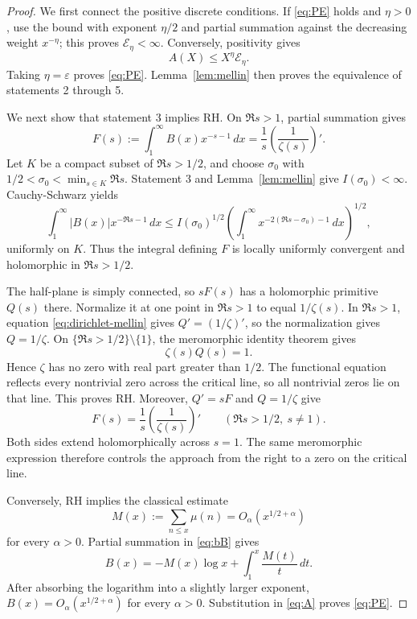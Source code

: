 \documentclass[11pt,a4paper]{amsart}
\theoremstyle{definition}
\theoremstyle{remark}
\begin{document}
\begin{proof}
We first connect the positive discrete conditions.  If
\eqref{eq:PE} holds and $\eta>0$, use the bound with exponent $\eta/2$
and partial summation against the decreasing weight $x^{-\eta}$; this
proves $\mathcal E_\eta<\infty$.  Conversely, positivity gives
\[
 A(X)\leq X^\eta\mathcal E_\eta.
\]
Taking $\eta=\varepsilon$ proves \eqref{eq:PE}.  Lemma~\ref{lem:mellin}
then proves the equivalence of statements 2 through 5.

We next show that statement 3 implies RH.  On $\Re s>1$, partial
summation gives
\begin{equation}\label{eq:dirichlet-mellin}
 F(s):=\int_1^\infty B(x)x^{-s-1}\,dx
 =\frac{1}{s}\left(\frac{1}{\zeta(s)}\right)'.
\end{equation}
Let $K$ be a compact subset of $\Re s>1/2$, and choose
$\sigma_0$ with $1/2<\sigma_0<\min_{s\in K}\Re s$.  Statement 3 and
Lemma~\ref{lem:mellin} give $I(\sigma_0)<\infty$.  Cauchy-Schwarz yields
\[
 \int_1^\infty |B(x)|x^{-\Re s-1}\,dx
 \leq I(\sigma_0)^{1/2}
 \left(\int_1^\infty
 x^{-2(\Re s-\sigma_0)-1}\,dx\right)^{1/2},
\]
uniformly on $K$.  Thus the integral defining $F$ is locally uniformly
convergent and holomorphic in $\Re s>1/2$.

The half-plane is simply connected, so $sF(s)$ has a holomorphic primitive
$Q(s)$ there.  Normalize it at one point in $\Re s>1$ to equal
$1/\zeta(s)$.  In $\Re s>1$, equation \eqref{eq:dirichlet-mellin} gives
$Q'=(1/\zeta)'$, so the normalization gives $Q=1/\zeta$.  On
$\{\Re s>1/2\}\setminus\{1\}$, the meromorphic identity theorem gives
\[
 \zeta(s)Q(s)=1.
\]
Hence $\zeta$ has no zero with real part greater than $1/2$.  The
functional equation reflects every nontrivial zero across the critical
line, so all nontrivial zeros lie on that line.  This proves RH.
Moreover, $Q'=sF$ and $Q=1/\zeta$ give
\[
 F(s)=\frac{1}{s}\left(\frac{1}{\zeta(s)}\right)'
 \qquad(\Re s>1/2,\ s\neq1).
\]
Both sides extend holomorphically across $s=1$.
The same meromorphic expression therefore controls the approach from the
right to a zero on the critical line.

Conversely, RH implies the classical estimate
\cite[Theorem~14.25(C)]{Titchmarsh1986}
\[
 M(x):=\sum_{n\leq x}\mu(n)
 =O_\alpha(x^{1/2+\alpha})
\]
for every $\alpha>0$.  Partial summation in \eqref{eq:bB} gives
\begin{equation}\label{eq:B-from-M}
 B(x)=-M(x)\log x+\int_1^x\frac{M(t)}{t}\,dt.
\end{equation}
After absorbing the logarithm into a slightly larger exponent,
$B(x)=O_\alpha(x^{1/2+\alpha})$ for every $\alpha>0$.  Substitution in
\eqref{eq:A} proves \eqref{eq:PE}.


\end{proof}
\end{document}
